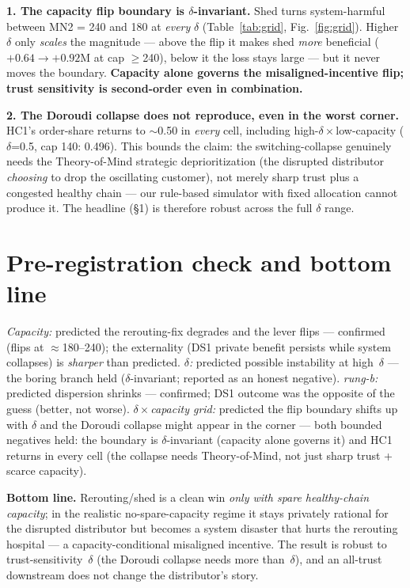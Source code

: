 \documentclass[11pt]{article}
\begin{document}
\textbf{1. The capacity flip boundary is $\delta$-invariant.} Shed turns system-harmful between
MN2 = 240 and 180 at \emph{every} $\delta$ (Table~\ref{tab:grid}, Fig.~\ref{fig:grid}). Higher
$\delta$ only \emph{scales} the magnitude --- above the flip it makes shed \emph{more} beneficial
($+0.64\to+0.92$M at cap $\ge$240), below it the loss stays large --- but it never moves the
boundary. \textbf{Capacity alone governs the misaligned-incentive flip; trust sensitivity is
second-order even in combination.}

\textbf{2. The Doroudi collapse does not reproduce, even in the worst corner.} HC1's order-share
returns to $\sim$0.50 in \emph{every} cell, including high-$\delta\times$low-capacity
($\delta$=0.5, cap 140: 0.496). This bounds the claim: the switching-collapse genuinely needs
the Theory-of-Mind strategic deprioritization (the disrupted distributor \emph{choosing} to drop
the oscillating customer), not merely sharp trust plus a congested healthy chain --- our
rule-based simulator with fixed allocation cannot produce it. The headline (\S1) is therefore
robust across the full $\delta$ range.

\section*{Pre-registration check and bottom line}

\emph{Capacity:} predicted the rerouting-fix degrades and the lever flips --- confirmed (flips
at $\approx$180--240); the externality (DS1 private benefit persists while system collapses) is
\emph{sharper} than predicted. \emph{$\delta$:} predicted possible instability at high~$\delta$
--- the boring branch held ($\delta$-invariant; reported as an honest negative). \emph{rung-b:}
predicted dispersion shrinks --- confirmed; DS1 outcome was the opposite of the guess (better,
not worse). \emph{$\delta\times$capacity grid:} predicted the flip boundary shifts up with
$\delta$ and the Doroudi collapse might appear in the corner --- both bounded negatives held:
the boundary is $\delta$-invariant (capacity alone governs it) and HC1 returns in every cell
(the collapse needs Theory-of-Mind, not just sharp trust + scarce capacity).

\medskip
\textbf{Bottom line.} Rerouting/shed is a clean win \emph{only with spare healthy-chain
capacity}; in the realistic no-spare-capacity regime it stays privately rational for the
disrupted distributor but becomes a system disaster that hurts the rerouting hospital --- a
capacity-conditional misaligned incentive. The result is robust to trust-sensitivity~$\delta$
(the Doroudi collapse needs more than~$\delta$), and an all-trust downstream does not change the
distributor's story.
\end{document}

